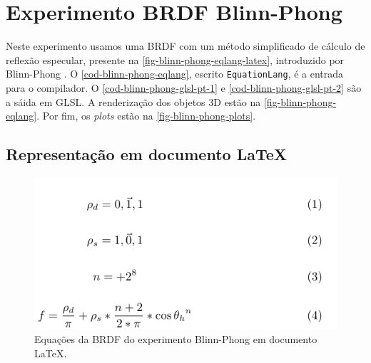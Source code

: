 
\section{Experimento BRDF Blinn-Phong} \label{section-experiment-blinn-phong}

Neste experimento usamos uma BRDF com um método simplificado de cálculo de reflexão especular, presente na \autoref{fig-blinn-phong-eqlang-latex}, introduzido por Blinn-Phong \cite{blinn1977models}. O \autoref{cod-blinn-phong-eqlang}, escrito \texttt{EquationLang}, é a entrada para o compilador. O \autoref{cod-blinn-phong-glsl-pt-1} e \autoref{cod-blinn-phong-glsl-pt-2} são a sáida em GLSL. A renderização dos objetos 3D estão na \autoref{fig-blinn-phong-eqlang}. Por fim, os \textit{plots} estão na \autoref{fig-blinn-phong-plots}.

\subsection{Representação em documento \LaTeX{}}
\begin{figure}[H]
    \caption{\label{fig-blinn-phong-eqlang-latex}
    \small Equações da BRDF do experimento Blinn-Phong em documento \LaTeX{}.}
    \begin{center}
        \includegraphics[scale=0.92]{./Imagens/brdfs/blinn-phong.pdf}
    \end{center}
\end{figure}


